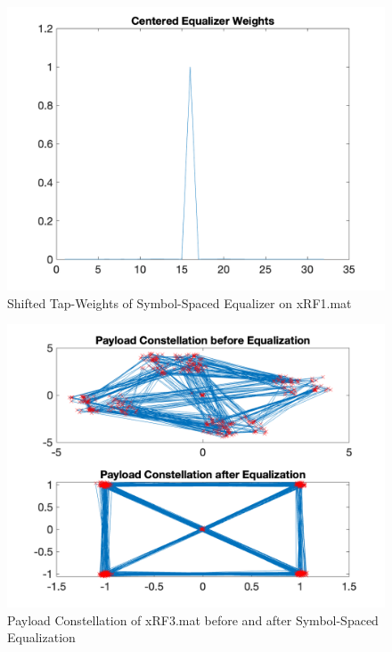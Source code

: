 \begin{figure}[h!]
    \centering
    \includegraphics[scale=0.4]{figures/shifted_tap_weights.png}
    \caption{Shifted Tap-Weights of Symbol-Spaced Equalizer on xRF1.mat}
    \label{fig:circ-weights}
\end{figure}
\begin{figure}[h!]
    \centering
    \includegraphics[scale=0.4]{figures/payload_equalization_part2.png}
    \caption{Payload Constellation of xRF3.mat before and after Symbol-Spaced Equalization}
    \label{fig:payload-equal-part2}
\end{figure}
